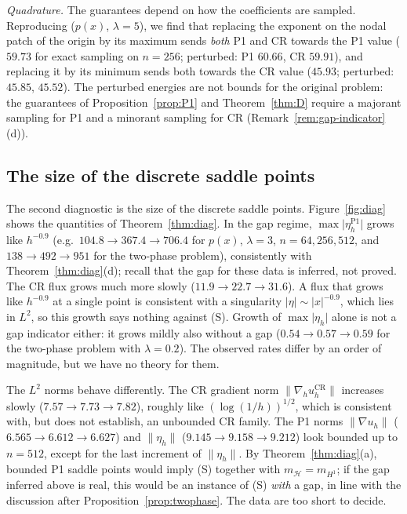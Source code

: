 \documentclass[11pt]{amsart}
\theoremstyle{definition}
\theoremstyle{remark}
\numberwithin{equation}{section}
\newcommand{\abs}[1]{\lvert #1\rvert}
\newcommand{\norm}[1]{\lVert #1\rVert}
\newcommand{\CR}{\mathrm{CR}}
\newcommand{\Pone}{\mathrm{P1}}
\newcommand{\mH}{m_{\mathcal H}}
\newcommand{\mHone}{m_{H^1}}
\begin{document}
\emph{Quadrature.} The guarantees depend on how the coefficients are sampled. Reproducing \cite[\S4.2]{BalciOrtnerStorn2022} ($p(x)$, $\lambda=5$), we find that replacing the exponent on the nodal patch of the origin by its maximum sends \emph{both} P1 and CR towards the P1 value ($59.73$ for exact sampling on $n=256$; perturbed: P1 $60.66$, CR $59.91$), and replacing it by its minimum sends both towards the CR value ($45.93$; perturbed: $45.85$, $45.52$). The perturbed energies are not bounds for the original problem: the guarantees of Proposition~\ref{prop:P1} and Theorem~\ref{thm:D} require a majorant sampling for P1 and a minorant sampling for CR (Remark~\ref{rem:gap-indicator}(d)).

\subsection{The size of the discrete saddle points}\label{ssec:diag-num}
The second diagnostic is the size of the discrete saddle points. Figure~\ref{fig:diag} shows the quantities of Theorem~\ref{thm:diag}. In the gap regime, $\max\abs{\eta_h^{\Pone}}$ grows like $h^{-0.9}$ (e.g.\ $104.8\to367.4\to706.4$ for $p(x)$, $\lambda=3$, $n=64,256,512$, and $138\to492\to951$ for the two-phase problem), consistently with Theorem~\ref{thm:diag}(d); recall that the gap for these data is inferred, not proved. The CR flux grows much more slowly ($11.9\to22.7\to31.6$). A flux that grows like $h^{-0.9}$ at a single point is consistent with a singularity $\abs{\eta}\sim\abs x^{-0.9}$, which lies in $L^2$, so this growth says nothing against (S). Growth of $\max\abs{\eta_h}$ alone is not a gap indicator either: it grows mildly also without a gap ($0.54\to0.57\to0.59$ for the two-phase problem with $\lambda=0.2$). The observed rates differ by an order of magnitude, but we have no theory for them.

The $L^2$ norms behave differently. The CR gradient norm $\norm{\nabla_hu_h^{\CR}}$ increases slowly ($7.57\to7.73\to7.82$), roughly like $(\log(1/h))^{1/2}$, which is consistent with, but does not establish, an unbounded CR family. The P1 norms $\norm{\nabla u_h}$ ($6.565\to6.612\to6.627$) and $\norm{\eta_h}$ ($9.145\to9.158\to9.212$) look bounded up to $n=512$, except for the last increment of $\norm{\eta_h}$. By Theorem~\ref{thm:diag}(a), bounded P1 saddle points would imply (S) together with $\mH=\mHone$; if the gap inferred above is real, this would be an instance of (S) \emph{with} a gap, in line with the discussion after Proposition~\ref{prop:twophase}. The data are too short to decide.
\end{document}
